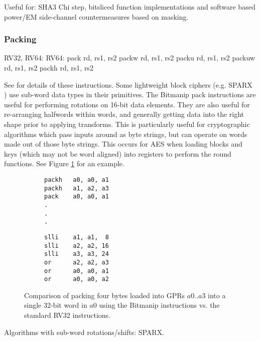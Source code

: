 Useful for:
SHA3 Chi step,
bitsliced function implementations
and
software based power/EM side-channel countermeasures based on masking.

\subsubsection{Packing}

\begin{cryptobitmanipisa}
RV32, RV64:                         RV64: 
    pack   rd, rs1, rs2                 packw  rd, rs1, rs2
    packu  rd, rs1, rs2                 packuw rd, rs1, rs2
    packh  rd, rs1, rs2
\end{cryptobitmanipisa}

See \cite[Section 2.1.4]{riscv:bitmanip:draft} for details of
these instructions.
Some lightweight block ciphers
(e.g. SPARX \cite{DPUVGB:16})
use sub-word data types in their primitives.
The Bitmanip pack instructions are useful for performing rotations on
16-bit data elements.
They are also useful for re-arranging halfwords within words, and
generally getting data into the right shape prior to applying transforms.
This is particularly useful for cryptographic algorithms which pass inputs
around as byte strings, but can operate on words made out of those byte
strings.
This occurs for AES when loading blocks and keys (which may not be
word aligned) into registers to perform the round functions.
See Figure \ref{fig:example:pack} for an example.

\begin{figure}
\begin{subfigure}[t]{0.5\textwidth}
\begin{lstlisting}
packh   a0, a0, a1
packh   a1, a2, a3
pack    a0, a0, a1
.
.
.
\end{lstlisting}
\end{subfigure}
\begin{subfigure}[t]{0.5\textwidth}
\begin{lstlisting}
slli    a1, a1,  8
slli    a2, a2, 16
slli    a3, a3, 24
or      a2, a2, a3
or      a0, a0, a1
or      a0, a0, a2
\end{lstlisting}
\end{subfigure}
\caption{Comparison of packing four bytes loaded into GPRs $a0..a3$ into
a single 32-bit word in $a0$ using the Bitmanip \mnemonic[pack*] instructions
vs. the standard RV32 instructions.}
\label{fig:example:pack}
\end{figure}

Algorithms with sub-word rotations/shifts:
SPARX.

